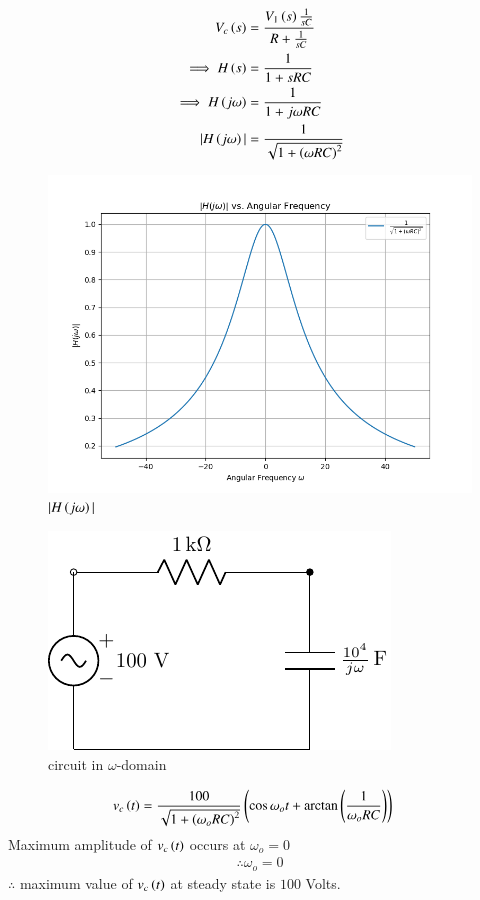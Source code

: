 \documentclass[journal,12pt,twocolumn]{IEEEtran}
\theoremstyle{remark}
\begin{document}
\begin{align}
V_c\left(s\right)&= \frac{V_1\left(s\right)\frac{1}{sC}}{R+\frac{1}{sC}}\\
\implies H\left(s\right) &= \frac{1}{1+ sRC}\\
\implies H\left(j\omega\right) &= \frac{1}{1+j\omega RC}\\
|H\left(j\omega\right)| &= \frac{1}{\sqrt{1+\left(\omega RC\right)^2}}
\end{align}
\begin{figure}[h!]
    \includegraphics[width = \columnwidth]{2023/BM/16/figs/Figure_1.png}
    \caption{$ |H\left(j\omega\right)|$ }
    \centering
    \label{fig: bm_16_fig_2}
\end{figure}


\begin{figure}[h!]
    \includegraphics[width = \columnwidth]{2023/BM/16/figs/c_fig2.pdf}
    \caption{circuit in $ \omega$-domain }
    \centering
    \label{fig: bm_16_fig_3}
\end{figure}

\begin{align}
v_c\left(t\right)&= \frac{100}{\sqrt{1+\left(\omega_o RC\right)^2}}\left(\cos{\omega_o t + \arctan\ensuremath{\left(\frac{1}{\omega_o RC}\right)}}\right)
\end{align}
Maximum amplitude of $ v_c\left(t\right)$ occurs at $ \omega_o=0$
\begin{align}
\therefore \omega_o =0
\end{align}
$ \therefore$ maximum value of $ v_c\left(t\right)$ at steady state is $ 100$ Volts.
\end{document}
